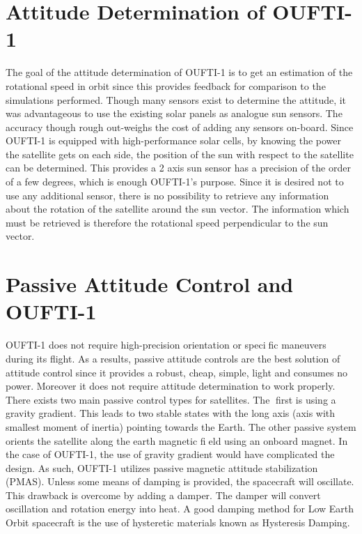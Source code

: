 \documentclass[12pt]{article}
\begin{document}
\section{Attitude Determination of OUFTI-1}
The goal of the attitude determination of OUFTI-1 is to get an estimation of the rotational
speed in orbit since this provides feedback for comparison to the simulations performed.
Though many sensors exist to determine the attitude, it was advantageous to use
the existing solar panels as analogue sun sensors. The accuracy though rough out-weighs the cost of adding any sensors on-board. Since OUFTI-1 is equipped with high-performance solar cells, by knowing the power
the satellite gets on each side, the position of the sun with respect to the satellite can be
determined. This provides a 2 axis sun sensor has a precision of the order of a few degrees,
which is enough OUFTI-1's purpose. Since it is desired not to use any additional sensor, there
is no possibility to retrieve any information about the rotation of the satellite around the
sun vector. The information which must be retrieved is therefore the rotational speed
perpendicular to the sun vector.
\section{Passive Attitude Control and OUFTI-1}
OUFTI-1 does not require high-precision orientation or specific maneuvers during its flight. As a results, passive attitude controls are the best solution of attitude control since it provides a robust, cheap, simple, light and consumes no power. Moreover it does not require attitude determination to work properly. 
\newline \newline
There exists two main passive control types for satellites. The first is using a  gravity gradient. This leads to two stable states with the long axis (axis with smallest moment of inertia) pointing towards the Earth. The other passive system orients the satellite along the earth magnetic field using an onboard magnet. In the case of OUFTI-1, the use of gravity gradient would have complicated the design. As such, OUFTI-1 utilizes passive magnetic attitude stabilization (PMAS).
\newline \newline
Unless some means of damping is provided, the spacecraft will oscillate. This drawback is overcome by adding a damper. The damper will convert oscillation and rotation energy into heat. A good damping method for Low Earth Orbit spacecraft is the use of hysteretic materials known as Hysteresis Damping.
\end{document}
